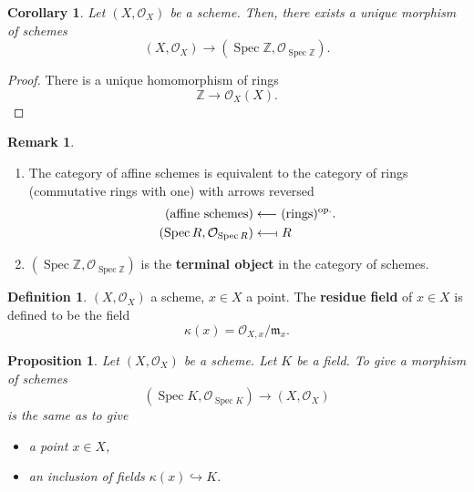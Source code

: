 \documentclass[12pt]{article}
\DeclareMathOperator{\Spec}{Spec}
\newtheorem*{proposition}{Proposition}
\newtheorem*{corollary}{Corollary}
\theoremstyle{definition}
\newtheorem*{definition}{Definition}
\newtheorem*{remark}{Remark}
\theoremstyle{remark}
\begin{document}
\begin{corollary}
Let $(X,\mathcal{O}_X)$ be a scheme. Then, there exists a unique morphism of schemes
\[(X,\mathcal{O}_X)\longrightarrow(\Spec\mathbb{Z},\mathcal{O}_{\Spec\mathbb{Z}}).\]
\end{corollary}

\begin{proof}
There is a unique homomorphism of rings
\[\mathbb{Z}\longrightarrow\mathcal{O}_X(X).\]
\end{proof}

\begin{remark}
\begin{enumerate}[label=\arabic*)]
\item The category of affine schemes is equivalent to the category of rings (commutative rings with one) with arrows reversed
\begin{align*}
(\text{affine schemes})&\longleftarrow(\text{rings})^{\text{op.}}.\\
(\Spec R,\mathcal{O}_{\Spec R})&\longleftarrow\!\shortmid R
\end{align*}

\item $(\Spec\mathbb{Z},\mathcal{O}_{\Spec\mathbb{Z}})$ is the \textbf{terminal object} in the category of schemes.
\end{enumerate}
\end{remark}

\begin{definition}
$(X,\mathcal{O}_X)$ a scheme, $x\in X$ a point. The \textbf{residue field} of $x\in X$ is defined to be the field
\[\kappa(x)=\mathcal{O}_{X,x}/\mathfrak{m}_x.\]
\end{definition}

\begin{proposition}
Let $(X,\mathcal{O}_X)$ be a scheme. Let $K$ be a field. To give a morphism of schemes
\[(\Spec K,\mathcal{O}_{\Spec K})\longrightarrow(X,\mathcal{O}_X)\]
is the same as to give
\begin{itemize}[label=$-$]
\item a point $x\in X$,
\item an inclusion of fields $\kappa(x)\hookrightarrow K$.
\end{itemize}
\end{proposition}
\end{document}
